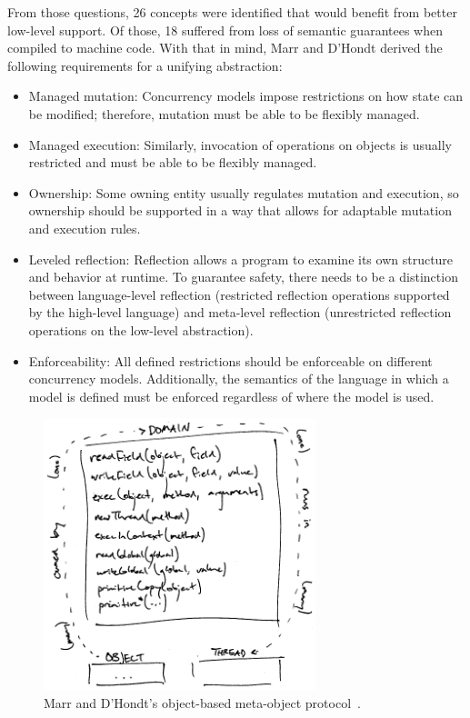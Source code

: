\documentclass{sig-alternate}
\begin{document}
From those questions, 26 concepts were identified that would benefit from better low-level support. Of those, 18 suffered from loss of semantic guarantees when compiled to machine code. With that in mind, Marr and D'Hondt derived the following requirements for a unifying abstraction:

\begin{itemize}
  \item Managed mutation: Concurrency models impose restrictions on how state can be modified; therefore, mutation must be able to be flexibly managed.

  \item Managed execution: Similarly, invocation of operations on objects is usually restricted and must be able to be flexibly managed.

  \item Ownership: Some owning entity usually regulates mutation and execution, so ownership should be supported in a way that allows for adaptable mutation and execution rules.

  \item Leveled reflection: Reflection allows a program to examine its own structure and behavior at runtime. To guarantee safety, there needs to be a distinction between language-level reflection (restricted reflection operations supported by the high-level language) and meta-level reflection (unrestricted reflection operations on the low-level abstraction).

  \item Enforceability: All defined restrictions should be enforceable on different concurrency models. Additionally, the semantics of the language in which a model is defined must be enforced regardless of where the model is used.
\end{itemize}

\begin{figure}[h]
  \centering
  \includegraphics[width=224pt]{obmop}
  \caption{Marr and D'Hondt's object-based meta-object protocol~\cite{Marr2012}.}
\label{figure:obmop}
\end{figure}
\end{document}
